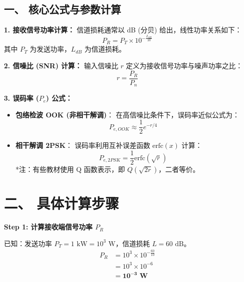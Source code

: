 \documentclass[a4paper,11pt]{ctexart}
\begin{document}
\begin{enumerate}[label=\textbf{7-\arabic*}]
\begin{tcolorbox}[colback=white, colframe=blue!50!black, title=\textbf{题目解答：7-12 OOK 与 2PSK 系统误码率计算}]
    \section*{一、 核心公式与参数计算}
    
    \textbf{1. 接收信号功率计算：}
    信道损耗通常以 dB (分贝) 给出，线性功率关系如下：
    \begin{equation}
        P_R = P_T \times 10^{-\frac{L_{dB}}{10}}
    \end{equation}
    其中 $P_T$ 为发送功率，$L_{dB}$ 为信道损耗。
    
    \textbf{2. 信噪比 (SNR) 计算：}
    输入信噪比 $r$ 定义为接收信号功率与噪声功率之比：
    \begin{equation}
        r = \frac{P_R}{P_n}
    \end{equation}
    
    \textbf{3. 误码率 ($P_e$) 公式：}
    \begin{itemize}
        \item \textbf{包络检波 OOK (非相干解调)}：
            在高信噪比条件下，误码率近似公式为：
            \begin{equation}
                P_{e, OOK} \approx \frac{1}{2} e^{-r/4}
            \end{equation}
        \item \textbf{相干解调 2PSK}：
            误码率利用互补误差函数 $\text{erfc}(x)$ 计算：
            \begin{equation}
                P_{e, 2PSK} = \frac{1}{2} \text{erfc}(\sqrt{r})
            \end{equation}
            \footnotesize{*注：有些教材使用 Q 函数表示，即 $Q(\sqrt{2r})$，二者等价。}
    \end{itemize}

    \end{tcolorbox}

    \section*{二、 具体计算步骤}
    
    \textbf{Step 1: 计算接收端信号功率 $P_R$}
    
    已知：发送功率 $P_T = 1 \text{ kW} = 10^3 \text{ W}$，信道损耗 $L = 60 \text{ dB}$。
    \begin{align*}
        P_R &= 10^3 \times 10^{-\frac{60}{10}} \\
            &= 10^3 \times 10^{-6} \\
            &= \mathbf{10^{-3} \text{ W}}
    \end{align*}
    

\end{enumerate}
\end{document}
